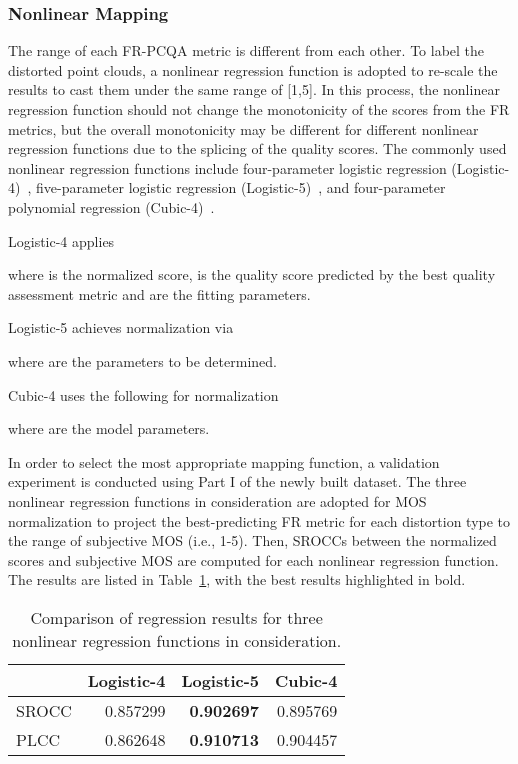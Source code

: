 \documentclass[acmsmall]{acmart}
\begin{document}
\subsubsection{Nonlinear Mapping}

\par The range of each FR-PCQA metric is different from each other. To label the distorted point clouds, a nonlinear regression function is adopted to re-scale the results to cast them under the same range of [1,5]. In this process, the nonlinear regression function should not change the monotonicity of the scores from the FR metrics, but the overall monotonicity may be different for different nonlinear regression functions due to the splicing of the quality scores. The commonly used nonlinear regression functions include four-parameter logistic regression (Logistic-4)~\cite{2000logistic4}, five-parameter logistic regression (Logistic-5)~\cite{Sheikh2006CSIQ}, and four-parameter polynomial regression (Cubic-4)~\cite{2012cubic4,2010cubic4}.

\par Logistic-4 applies

where  is the normalized score,  is the quality score predicted by the best quality assessment metric and  are the fitting parameters.

\par Logistic-5 achieves normalization via

where  are the parameters to be determined.

\par Cubic-4 uses the following for normalization

where  are the model parameters.

\par In order to select the most appropriate mapping function, a validation experiment is conducted using Part I of the newly built dataset. The three nonlinear regression functions in consideration are adopted for MOS normalization to project the best-predicting FR metric for each distortion type to the range of subjective MOS (i.e., 1-5). Then, SROCCs between the normalized scores and subjective MOS are computed for each nonlinear regression function. The results are listed in Table~\ref{nonlinear}, with the best results highlighted in bold.


\begin{table}[htbp]
  \centering
  \caption{Comparison of regression results for three nonlinear regression functions in consideration.}
  \begin{footnotesize}
    \begin{tabular}{l|rrr}
    \hline
          & \multicolumn{1}{l}{Logistic-4} & \multicolumn{1}{l}{Logistic-5} & \multicolumn{1}{l}{Cubic-4} \\
    \hline
    SROCC & 0.857299 & \textbf{0.902697} & 0.895769 \\
    PLCC  & 0.862648 & \textbf{0.910713} & 0.904457 \\
    \hline
    \end{tabular}\end{footnotesize}
  \label{nonlinear}\end{table}
\end{document}
